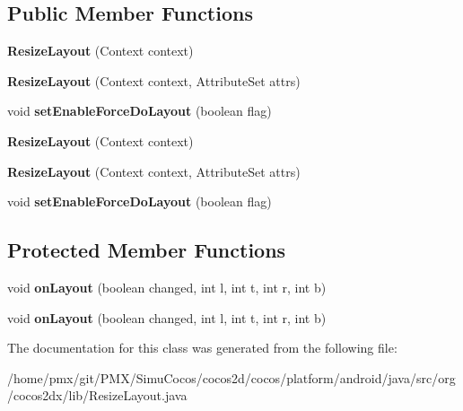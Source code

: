\subsection*{Public Member Functions}
\begin{DoxyCompactItemize}
\item 
\mbox{\label{classorg_1_1cocos2dx_1_1lib_1_1ResizeLayout_a4ac66c2f1bae612cdd53d0bbdd1f9061}} 
{\bfseries Resize\+Layout} (Context context)
\item 
\mbox{\label{classorg_1_1cocos2dx_1_1lib_1_1ResizeLayout_a6240e36c578d3fcd2d18e7af0db27d00}} 
{\bfseries Resize\+Layout} (Context context, Attribute\+Set attrs)
\item 
\mbox{\label{classorg_1_1cocos2dx_1_1lib_1_1ResizeLayout_ab36f746977f48aee07414dd9b183aca5}} 
void {\bfseries set\+Enable\+Force\+Do\+Layout} (boolean flag)
\item 
\mbox{\label{classorg_1_1cocos2dx_1_1lib_1_1ResizeLayout_a4ac66c2f1bae612cdd53d0bbdd1f9061}} 
{\bfseries Resize\+Layout} (Context context)
\item 
\mbox{\label{classorg_1_1cocos2dx_1_1lib_1_1ResizeLayout_a6240e36c578d3fcd2d18e7af0db27d00}} 
{\bfseries Resize\+Layout} (Context context, Attribute\+Set attrs)
\item 
\mbox{\label{classorg_1_1cocos2dx_1_1lib_1_1ResizeLayout_ab36f746977f48aee07414dd9b183aca5}} 
void {\bfseries set\+Enable\+Force\+Do\+Layout} (boolean flag)
\end{DoxyCompactItemize}
\subsection*{Protected Member Functions}
\begin{DoxyCompactItemize}
\item 
\mbox{\label{classorg_1_1cocos2dx_1_1lib_1_1ResizeLayout_ae5e783a7f2617257b791afca98cc910f}} 
void {\bfseries on\+Layout} (boolean changed, int l, int t, int r, int b)
\item 
\mbox{\label{classorg_1_1cocos2dx_1_1lib_1_1ResizeLayout_ae5e783a7f2617257b791afca98cc910f}} 
void {\bfseries on\+Layout} (boolean changed, int l, int t, int r, int b)
\end{DoxyCompactItemize}


The documentation for this class was generated from the following file\+:\begin{DoxyCompactItemize}
\item 
/home/pmx/git/\+P\+M\+X/\+Simu\+Cocos/cocos2d/cocos/platform/android/java/src/org/cocos2dx/lib/Resize\+Layout.\+java\end{DoxyCompactItemize}
